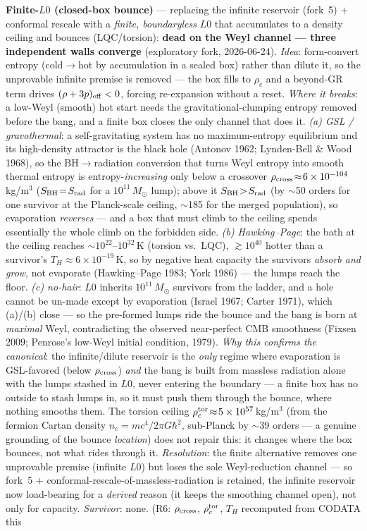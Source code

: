 \documentclass[11pt]{article}
\newcommand{\msun}{M_\odot}
\begin{document}
\textbf{Finite-$L0$ (closed-box bounce)} --- replacing the infinite reservoir (fork~5) $+$ conformal rescale with a \emph{finite, boundaryless} $L0$ that accumulates to a density ceiling and bounces (LQC/torsion): \textbf{dead on the Weyl channel --- three independent walls converge} (exploratory fork, 2026-06-24). \emph{Idea}: form-convert entropy (cold$\to$hot by accumulation in a sealed box) rather than dilute it, so the unprovable infinite premise is removed --- the box fills to $\rho_c$ and a beyond-GR term drives $(\rho+3p)_{\rm eff}<0$, forcing re-expansion without a reset. \emph{Where it breaks}: a low-Weyl (smooth) hot start needs the gravitational-clumping entropy removed before the bang, and a finite box closes the only channel that does it. \emph{(a) GSL / gravothermal}: a self-gravitating system has no maximum-entropy equilibrium and its high-density attractor is the black hole (Antonov 1962; Lynden-Bell \& Wood 1968), so the $\mathrm{BH}\!\to\!$radiation conversion that turns Weyl entropy into smooth thermal entropy is entropy-\emph{increasing} only below a crossover $\rho_{\rm cross}\!\approx\!6\times10^{-104}$\,kg/m$^3$ ($S_{\rm BH}\!=\!S_{\rm rad}$ for a $10^{11}\,\msun$ lump); above it $S_{\rm BH}\!>\!S_{\rm rad}$ (by $\sim$50 orders for one survivor at the Planck-scale ceiling, $\sim$185 for the merged population), so evaporation \emph{reverses} --- and a box that must climb to the ceiling spends essentially the whole climb on the forbidden side. \emph{(b) Hawking--Page}: the bath at the ceiling reaches $\sim10^{22}$--$10^{32}$\,K (torsion vs.\ LQC), $\gtrsim10^{40}$ hotter than a survivor's $T_H\!\approx\!6\times10^{-19}$\,K, so by negative heat capacity the survivors \emph{absorb and grow}, not evaporate (Hawking--Page 1983; York 1986) --- the lumps reach the floor. \emph{(c) no-hair}: $L0$ inherits $10^{11}\,\msun$ survivors from the ladder, and a hole cannot be un-made except by evaporation (Israel 1967; Carter 1971), which (a)/(b) close --- so the pre-formed lumps ride the bounce and the bang is born at \emph{maximal} Weyl, contradicting the observed near-perfect CMB smoothness (Fixsen 2009; Penrose's low-Weyl initial condition, 1979). \emph{Why this confirms the canonical}: the infinite/dilute reservoir is the \emph{only} regime where evaporation is GSL-favored (below $\rho_{\rm cross}$) \emph{and} the bang is built from massless radiation alone with the lumps stashed in $L0$, never entering the boundary --- a finite box has no outside to stash lumps in, so it must push them through the bounce, where nothing smooths them. The torsion ceiling $\rho_c^{\rm tor}\!\approx\!5\times10^{57}$\,kg/m$^3$ (from the fermion Cartan density $n_c\!=\!mc^4/2\pi G\hbar^2$, sub-Planck by $\sim$39 orders --- a genuine grounding of the bounce \emph{location}) does not repair this: it changes where the box bounces, not what rides through it. \emph{Resolution}: the finite alternative removes one unprovable premise (infinite $L0$) but loses the sole Weyl-reduction channel --- so fork~5 $+$ conformal-rescale-of-massless-radiation is retained, the infinite reservoir now load-bearing for a \emph{derived} reason (it keeps the smoothing channel open), not only for capacity. \emph{Survivor}: none. (R6: $\rho_{\rm cross}$, $\rho_c^{\rm tor}$, $T_H$ recomputed from CODATA this 
\end{document}
